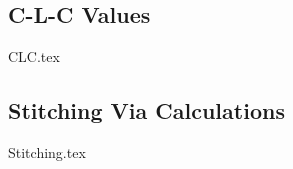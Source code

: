 \subsection{C-L-C Values}\label{sec:clc-values}
    {CLC.tex}



\subsection{Stitching Via Calculations}\label{sec:stitching-calc}
    {Stitching.tex}